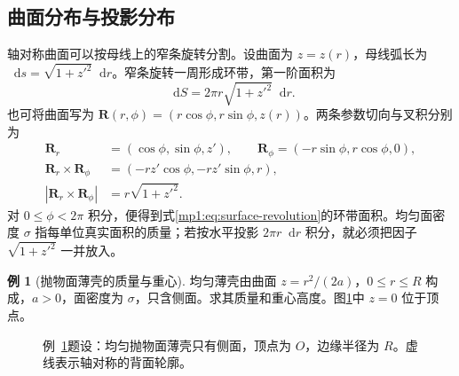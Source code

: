 \documentclass[11pt,openany,fontset=fandol]{ctexbook}
\theoremstyle{definition}\newtheorem{example}{例}[chapter]\newtheorem{exercise}{习题}[chapter]
\newcommand{\dd}{\mathop{}\!\mathrm d}\newcommand{\ee}{\mathrm e}\newcommand{\vct}[1]{\bm{#1}}
\begin{document}
\subsection{曲面分布与投影分布}
轴对称曲面可以按母线上的窄条旋转分割。设曲面为 $z=z(r)$，母线弧长为 $\dd s=\sqrt{1+z'^2}\dd r$。窄条旋转一周形成环带，第一阶面积为
\begin{equation}\label{mp1:eq:surface-revolution}
\dd S=2\pi r\sqrt{1+z'^2}\dd r.
\end{equation}
也可将曲面写为 $\vct R(r,\phi)=(r\cos\phi,r\sin\phi,z(r))$。两条参数切向与叉积分别为
\[
\begin{aligned}
\vct R_r&=(\cos\phi,\sin\phi,z'),\qquad
\vct R_\phi=(-r\sin\phi,r\cos\phi,0),\\
\vct R_r\times\vct R_\phi&=(-rz'\cos\phi,-rz'\sin\phi,r),\\
|\vct R_r\times\vct R_\phi|&=r\sqrt{1+z'^2}.
\end{aligned}
\]
对 $0\le\phi<2\pi$ 积分，便得到式\eqref{mp1:eq:surface-revolution}的环带面积。均匀面密度 $\sigma$ 指每单位真实面积的质量；若按水平投影 $2\pi r\dd r$ 积分，就必须把因子 $\sqrt{1+z'^2}$ 一并放入。

\par\medskip\noindent\begin{minipage}{\textwidth}
\begin{example}[抛物面薄壳的质量与重心]\label{mp1:ex:e3}
均匀薄壳由曲面 $z=r^2/(2a)$，$0\le r\le R$ 构成，$a>0$，面密度为 $\sigma$，只含侧面。求其质量和重心高度。图\ref{mp1:fig:e3-q}中 $z=0$ 位于顶点。
\end{example}

\begin{figure}[H]\centering

\caption{例~\ref{mp1:ex:e3}题设：均匀抛物面薄壳只有侧面，顶点为 $O$，边缘半径为 $R$。虚线表示轴对称的背面轮廓。}\label{mp1:fig:e3-q}
\end{figure}

\end{minipage}\par\medskip
\end{document}

